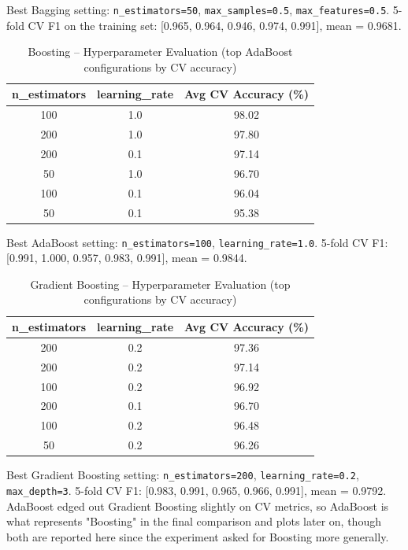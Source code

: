 \documentclass[12pt,a4paper]{article}
\begin{document}
Best Bagging setting: \texttt{n\_estimators=50}, \texttt{max\_samples=0.5}, \texttt{max\_features=0.5}.
5-fold CV F1 on the training set: [0.965, 0.964, 0.946, 0.974, 0.991], mean = 0.9681.

\begin{table}[H]
\centering
\caption{Boosting -- Hyperparameter Evaluation (top AdaBoost configurations by CV accuracy)}
\begin{tabular}{ccc}
\toprule
n\_estimators & learning\_rate & Avg CV Accuracy (\%) \\
\midrule
100 & 1.0 & 98.02 \\
200 & 1.0 & 97.80 \\
200 & 0.1 & 97.14 \\
50 & 1.0 & 96.70 \\
100 & 0.1 & 96.04 \\
50 & 0.1 & 95.38 \\
\bottomrule
\end{tabular}
\end{table}

Best AdaBoost setting: \texttt{n\_estimators=100}, \texttt{learning\_rate=1.0}.
5-fold CV F1: [0.991, 1.000, 0.957, 0.983, 0.991], mean = 0.9844.

\begin{table}[H]
\centering
\caption{Gradient Boosting -- Hyperparameter Evaluation (top configurations by CV accuracy)}
\begin{tabular}{ccc}
\toprule
n\_estimators & learning\_rate & Avg CV Accuracy (\%) \\
\midrule
200 & 0.2 & 97.36 \\
200 & 0.2 & 97.14 \\
100 & 0.2 & 96.92 \\
200 & 0.1 & 96.70 \\
100 & 0.2 & 96.48 \\
50 & 0.2 & 96.26 \\
\bottomrule
\end{tabular}
\end{table}

Best Gradient Boosting setting: \texttt{n\_estimators=200}, \texttt{learning\_rate=0.2},
\texttt{max\_depth=3}. 5-fold CV F1: [0.983, 0.991, 0.965, 0.966, 0.991], mean = 0.9792. AdaBoost
edged out Gradient Boosting slightly on CV metrics, so AdaBoost is what represents "Boosting" in the
final comparison and plots later on, though both are reported here since the experiment asked for
Boosting more generally.
\end{document}
